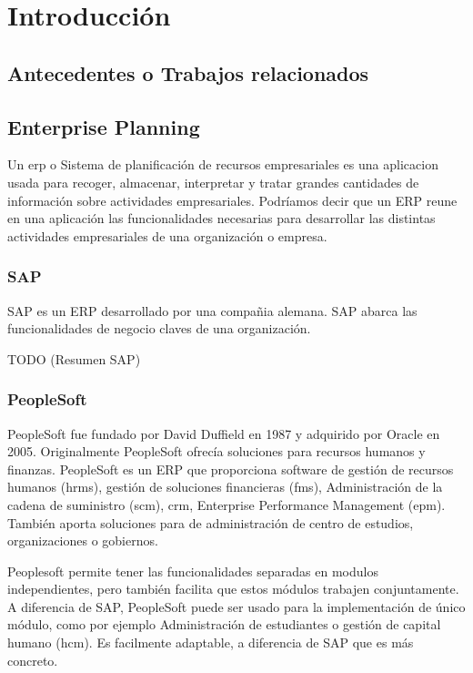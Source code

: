 \chapter{Introducción}

\section{Antecedentes o Trabajos relacionados}


\section[ERP's]{Enterprise Planning}

Un \gls{erp} o Sistema de planificación de recursos empresariales es una aplicacion usada para recoger, almacenar, interpretar y tratar grandes cantidades de información sobre actividades empresariales.
Podríamos decir que un ERP reune en una aplicación las funcionalidades necesarias para desarrollar las distintas actividades empresariales de una organización o empresa.

\subsection{SAP}
SAP es un ERP desarrollado por una compañia alemana. SAP abarca las funcionalidades de negocio claves de una organización.

TODO (Resumen SAP)

\subsection{PeopleSoft}
PeopleSoft fue fundado por David Duffield en 1987 y adquirido por Oracle en 2005.
Originalmente PeopleSoft ofrecía soluciones para recursos humanos y finanzas.
PeopleSoft es un ERP que proporciona software de gestión de recursos humanos (\acrshort{hrms}), gestión de soluciones financieras (\acrshort{fms}),
Administración de la cadena de suministro (\acrshort{scm}),  \acrfull{crm}, Enterprise Performance Management (\acrshort{epm}).
También aporta soluciones para de administración de centro de estudios, organizaciones o gobiernos.

Peoplesoft permite tener las funcionalidades separadas en modulos independientes, pero también facilita que estos módulos trabajen conjuntamente.
A diferencia de SAP, PeopleSoft puede ser usado para la implementación de único módulo, como por ejemplo Administración de estudiantes o gestión de capital humano (hcm).
Es facilmente adaptable, a diferencia de SAP que es más concreto.


